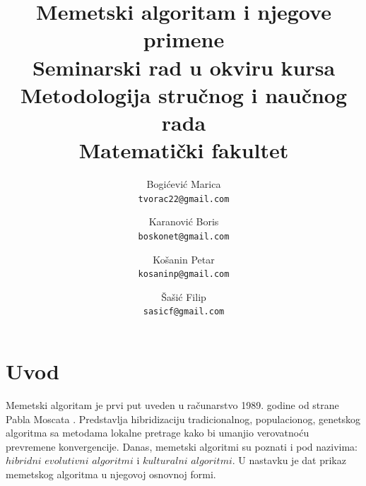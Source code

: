 \documentclass[a4paper]{article}
\begin{document}
\title{Memetski algoritam i njegove primene\\ \small{Seminarski rad u okviru kursa\\Metodologija stručnog i naučnog rada\\ Matematički fakultet}}


\author{
  Bogićević Marica\\
  \texttt{tvorac22@gmail.com}
  \and
  Karanović Boris\\
  \texttt{boskonet@gmail.com}
    \and
  Košanin Petar\\
  \texttt{kosaninp@gmail.com}
    \and
  Šašić Filip\\
  \texttt{sasicf@gmail.com}
}


\maketitle


\tableofcontents

\newpage

\section{Uvod}
\label{sec:uvod}

Memetski algoritam je prvi put uveden u računarstvo 1989. godine od strane Pabla Moscata \cite{towardsmemetic}. Predstavlja hibridizaciju tradicionalnog, populacionog, genetskog algoritma sa metodama lokalne pretrage kako bi umanjio verovatnoću prevremene konvergencije. Danas, memetski algoritmi su poznati i pod nazivima: $hibridni$ $evolutivni$ $algoritmi$ i $kulturalni$ $algoritmi$. U nastavku je dat prikaz memetskog algoritma u njegovoj osnovnoj formi.
\end{document}
